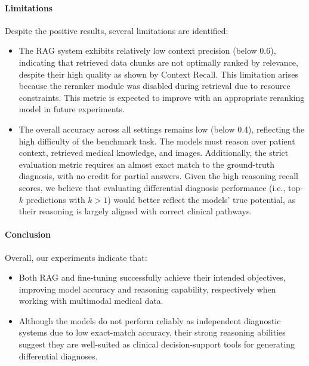 \paragraph{Limitations}
Despite the positive results, several limitations are identified:
\begin{itemize}
    \item The RAG system exhibits relatively low context precision (below 0.6), indicating that retrieved data chunks are not optimally ranked by relevance, despite their high quality as shown by Context Recall. This limitation arises because the reranker module was disabled during retrieval due to resource constraints. This metric is expected to improve with an appropriate reranking model in future experiments.
    
    \item The overall accuracy across all settings remains low (below 0.4), reflecting the high difficulty of the benchmark task. The models must reason over patient context, retrieved medical knowledge, and images. Additionally, the strict evaluation metric requires an almost exact match to the ground-truth diagnosis, with no credit for partial answers. Given the high reasoning recall scores, we believe that evaluating differential diagnosis performance (i.e., top-$k$ predictions with $k>1$) would better reflect the models’ true potential, as their reasoning is largely aligned with correct clinical pathways.
\end{itemize}

\paragraph{Conclusion}
Overall, our experiments indicate that:
\begin{itemize}
    \item Both \ac{RAG} and fine-tuning successfully achieve their intended objectives, improving model accuracy and reasoning capability, respectively when working with multimodal medical data.
    \item Although the models do not perform reliably as independent diagnostic systems due to low exact-match accuracy, their strong reasoning abilities suggest they are well-suited as clinical decision-support tools for generating differential diagnoses.
\end{itemize}
